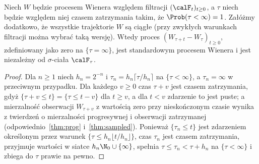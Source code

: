 \begin{twierdzenie}
\label{thm:wiener-strong-markov}
Niech $W$ będzie procesem Wienera względem filtracji
$(\calF_t)_{t\ge0}$, a $\tau$ niech będzie względem niej
czasem zatrzymania takim, że $\Prob(\tau<\infty)=1$.
Załóżmy dodatkowo, że wszystkie trajektorie $W$ są
ciągłe (przy zwykłych warunkach filtracji można wybrać
taką wersję). Wtedy proces $(W_{\tau+t}-W_\tau)_{t\ge0}$,
zdefiniowany jako zero na $\{\tau=\infty\}$, jest
standardowym procesem Wienera i jest niezależny od
$\sigma$-ciała $\calF_\tau$.
\end{twierdzenie}
\begin{proof}
Dla $n\ge1$ niech $h_n=2^{-n}$ i
$\tau_n=h_n\lceil\tau/h_n\rceil$ na $\{\tau<\infty\}$,
a $\tau_n=\infty$ w przeciwnym przypadku.
Dla każdego $v\ge0$ czas $\tau+v$ jest czasem zatrzymania,
gdyż $\{\tau+v\le t\}=\{\tau\le t-v\}$ dla $t\ge v$,
a dla $t<v$ zdarzenie to jest puste;
a mierzalność obserwacji $W_{\tau+v}$ z wartością zero
przy nieskończonym czasie wynika z twierdzeń
o mierzalności progresywnej i obserwacji zatrzymanej
(odpowiednio~\ref{thm:prog} i~\ref{thm:sampled}).
Ponieważ $\{\tau_n\le t\}$ jest zdarzeniem określonym
przez warunek $\{\tau\le h_n\lfloor t/h_n\rfloor\}$,
czas $\tau_n$ jest czasem zatrzymania, przyjmuje wartości
w siatce $h_n\N_0\cup\{\infty\}$, spełnia
$\tau\le\tau_n<\tau+h_n$ na $\{\tau<\infty\}$
i zbiega do $\tau$ prawie na pewno.


\end{proof}
